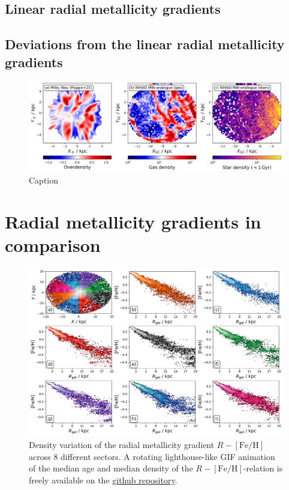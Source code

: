 \documentclass[fleqn,usenatbib]{mnras}
\begin{document}
\subsection{Linear radial metallicity gradients}
\label{sec:linear_radial_metallicity_gradients}

\subsection{Deviations from the linear radial metallicity gradients}
\label{sec:deviations_radial_metallicity_gradients}

\begin{figure}
    \centering
    \includegraphics[width=\textwidth]{figures/overdensities_mw_vs_nihao.png}
    \caption{Caption}
    \label{fig:overdensities_mw_vs_nihao}
\end{figure}

\section{Radial metallicity gradients in comparison}
\label{sec:radial_metallicity_gradient_comparison}

\begin{figure}
    \centering
    \includegraphics[width=\textwidth]{figures/radial_metallicity_gradients_mw_in_angles.png}
    \caption{Density variation of the radial metallicity gradient $R-\mathrm{[Fe/H]}$ across 8 different sectors. A rotating lighthouse-like GIF animation of the median age and median density of the $R-\mathrm{[Fe/H]}$-relation is freely available on the \href{https://github.com/svenbuder/nihao_radial_metallicity_gradients/blob/main/figures/xyz_rfeh.gif}{github repository}.}
    \label{fig:radial_metallicity_gradients_mw_in_angles}
\end{figure}
\end{document}
